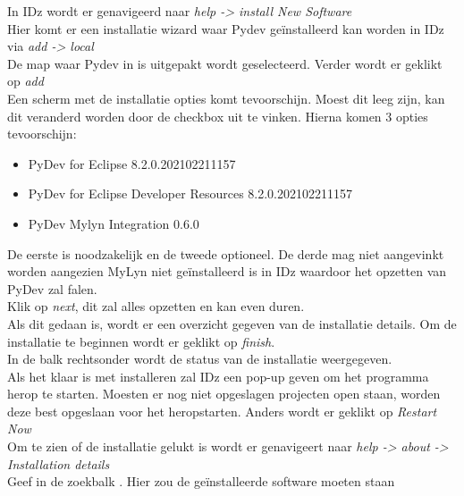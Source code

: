 In IDz wordt er genavigeerd naar \textit{help -> install New Software}  \\

Hier komt er een installatie wizard waar Pydev geïnstalleerd kan worden in IDz via \textit{add -> local} \\

De map waar Pydev in is uitgepakt wordt geselecteerd. Verder wordt er geklikt op \textit{add} \\

Een scherm met de installatie opties komt tevoorschijn. Moest dit leeg zijn, kan dit veranderd worden door de checkbox  uit te vinken. Hierna komen 3 opties tevoorschijn:

\begin{itemize}
    \item PyDev for Eclipse 8.2.0.202102211157
    \item PyDev for Eclipse Developer Resources 8.2.0.202102211157
    \item PyDev Mylyn Integration 0.6.0
\end{itemize}

De eerste is noodzakelijk en de tweede optioneel. De derde mag niet aangevinkt worden aangezien MyLyn niet geïnstalleerd is in IDz waardoor het opzetten van PyDev zal falen. \\ 

Klik op \textit{next}, dit zal alles opzetten en kan even duren. \\

Als dit gedaan is, wordt er een overzicht gegeven van de installatie details. Om de installatie te beginnen wordt er geklikt op \textit{finish}. \\

In de balk rechtsonder wordt de status van de installatie weergegeven. \\

Als het klaar is met installeren zal IDz een pop-up geven om het programma herop te starten. Moesten er nog niet opgeslagen projecten open staan, worden deze best opgeslaan voor het heropstarten. Anders wordt er geklikt op \textit{Restart Now} \\ 

Om te zien of de installatie gelukt is wordt er genavigeert naar \textit{help -> about -> Installation details} \\

Geef in de zoekbalk . Hier zou de geïnstalleerde software moeten staan \\ 

